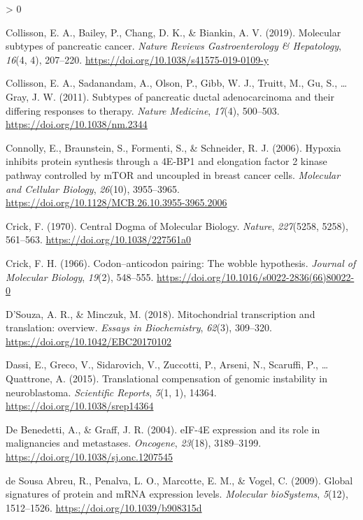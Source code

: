 \documentclass[
  12pt,
  openany]{book}
\newlength{\cslhangindent}
\newenvironment{CSLReferences}[2] %
 {%
  \setlength{\parindent}{0pt}
  \ifodd #1 \everypar{\setlength{\hangindent}{\cslhangindent}}\ignorespaces\fi
  \ifnum #2 > 0
  \setlength{\parskip}{#2\baselineskip}
  \fi
 }%
 {}
\begin{document}
\begin{CSLReferences}{1}{0}
\leavevmode\hypertarget{ref-Collisson2019}{}%
Collisson, E. A., Bailey, P., Chang, D. K., \& Biankin, A. V. (2019). Molecular subtypes of pancreatic cancer. \emph{Nature Reviews Gastroenterology \& Hepatology}, \emph{16}(4, 4), 207--220. \url{https://doi.org/10.1038/s41575-019-0109-y}

\leavevmode\hypertarget{ref-Collisson2011}{}%
Collisson, E. A., Sadanandam, A., Olson, P., Gibb, W. J., Truitt, M., Gu, S., \ldots{} Gray, J. W. (2011). Subtypes of pancreatic ductal adenocarcinoma and their differing responses to therapy. \emph{Nature Medicine}, \emph{17}(4), 500--503. \url{https://doi.org/10.1038/nm.2344}

\leavevmode\hypertarget{ref-Connolly2006}{}%
Connolly, E., Braunstein, S., Formenti, S., \& Schneider, R. J. (2006). Hypoxia inhibits protein synthesis through a {4E}-{BP1} and elongation factor 2 kinase pathway controlled by {mTOR} and uncoupled in breast cancer cells. \emph{Molecular and Cellular Biology}, \emph{26}(10), 3955--3965. \url{https://doi.org/10.1128/MCB.26.10.3955-3965.2006}

\leavevmode\hypertarget{ref-Crick1970}{}%
Crick, F. (1970). Central {Dogma} of {Molecular Biology}. \emph{Nature}, \emph{227}(5258, 5258), 561--563. \url{https://doi.org/10.1038/227561a0}

\leavevmode\hypertarget{ref-Crick1966}{}%
Crick, F. H. (1966). Codon--anticodon pairing: The wobble hypothesis. \emph{Journal of Molecular Biology}, \emph{19}(2), 548--555. \url{https://doi.org/10.1016/s0022-2836(66)80022-0}

\leavevmode\hypertarget{ref-DSouza2018}{}%
D'Souza, A. R., \& Minczuk, M. (2018). Mitochondrial transcription and translation: overview. \emph{Essays in Biochemistry}, \emph{62}(3), 309--320. \url{https://doi.org/10.1042/EBC20170102}

\leavevmode\hypertarget{ref-Dassi2015}{}%
Dassi, E., Greco, V., Sidarovich, V., Zuccotti, P., Arseni, N., Scaruffi, P., \ldots{} Quattrone, A. (2015). Translational compensation of genomic instability in neuroblastoma. \emph{Scientific Reports}, \emph{5}(1, 1), 14364. \url{https://doi.org/10.1038/srep14364}

\leavevmode\hypertarget{ref-DeBenedetti2004}{}%
De Benedetti, A., \& Graff, J. R. (2004). {eIF}-{4E} expression and its role in malignancies and metastases. \emph{Oncogene}, \emph{23}(18), 3189--3199. \url{https://doi.org/10.1038/sj.onc.1207545}

\leavevmode\hypertarget{ref-deSousaAbreu2009}{}%
de Sousa Abreu, R., Penalva, L. O., Marcotte, E. M., \& Vogel, C. (2009). Global signatures of protein and {mRNA} expression levels. \emph{Molecular bioSystems}, \emph{5}(12), 1512--1526. \url{https://doi.org/10.1039/b908315d}


\end{CSLReferences}
\end{document}
